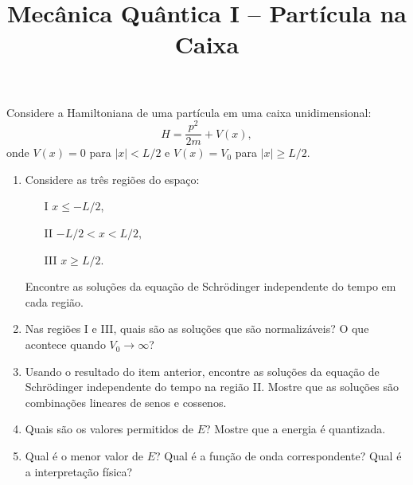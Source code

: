 \newif\ifuseseminar
\useseminartrue


\title{Mecânica Quântica I -- Partícula na Caixa}	



Considere a Hamiltoniana de uma partícula em uma caixa unidimensional:
\begin{equation*}
  H = \frac{p^2}{2m} + V(x),
\end{equation*}
onde $V(x) = 0$ para $|x| < L/2$ e $V(x) = V_0$ para $|x| \geq L/2$.
\begin{enumerate}
  \item Considere as três regiões do espaço:
        \begin{enumerate}
          \item[I] $x \leq -L/2$,
          \item[II] $-L/2 < x < L/2$,
          \item[III] $x \geq L/2$.
        \end{enumerate}
        Encontre as soluções da equação de Schrödinger independente do tempo em cada
        região.
  \item Nas regiões I e III, quais são as soluções que são normalizáveis? O que acontece
        quando $V_0 \to \infty$?
  \item Usando o resultado do item anterior, encontre as soluções da equação de
        Schrödinger independente do tempo na região II. Mostre que as soluções são
        combinações lineares de senos e cossenos.
  \item Quais são os valores permitidos de $E$? Mostre que a energia é quantizada.
  \item Qual é o menor valor de $E$? Qual é a função de onda correspondente? Qual é
        a interpretação física?
\end{enumerate}


